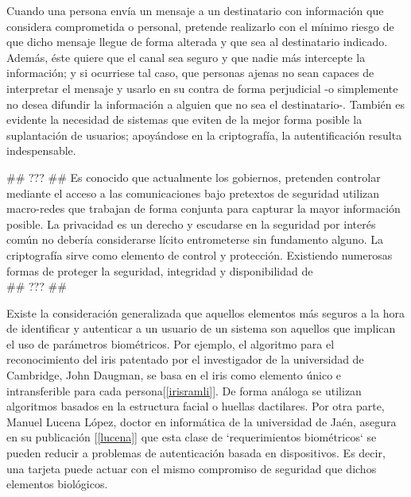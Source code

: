 \documentclass[PFC.tex]{subfiles}
\begin{document}
Cuando una persona envía un mensaje a un destinatario con información que considera comprometida o personal, pretende realizarlo con el mínimo riesgo de que dicho mensaje llegue de forma alterada y que sea al destinatario indicado. Además, éste quiere que el canal sea seguro y que nadie más intercepte la información; y si ocurriese tal caso, que personas ajenas no sean capaces de interpretar el mensaje y usarlo en su contra de forma perjudicial -o simplemente no desea difundir la información a alguien que no sea el destinatario-. También es evidente la necesidad de sistemas que eviten de la mejor forma posible la suplantación de usuarios; apoyándose en la criptografía, la autentificación resulta indespensable.


## ??? ##
Es conocido que actualmente los gobiernos, pretenden controlar mediante el acceso a las comunicaciones bajo pretextos de seguridad utilizan macro-redes que trabajan de forma conjunta para capturar la mayor información posible.  La privacidad es un derecho y escudarse en la seguridad por interés común no debería considerarse lícito entrometerse sin fundamento alguno. La criptografía sirve como elemento de control y protección. Existiendo numerosas formas de proteger la seguridad, integridad y disponibilidad de \\
## ??? ##

Existe la consideración generalizada que aquellos elementos más seguros a la hora de identificar y autenticar a un usuario de un sistema son aquellos que implican el uso de parámetros biométricos. Por ejemplo, el algoritmo para el reconocimiento del iris patentado por el investigador de la universidad de Cambridge, John Daugman, se basa en el iris como elemento único e intransferible para cada persona[\ref{irisramli}]. De forma análoga se utilizan algoritmos basados en la estructura facial o huellas dactilares. Por otra parte, Manuel Lucena López, doctor en informática de la universidad de Jaén, asegura en su publicación [\ref{lucena}] que esta clase de `requerimientos biométricos` se pueden reducir a problemas de autenticación basada en dispositivos. Es decir, una tarjeta puede actuar con el mismo compromiso de seguridad que dichos elementos biológicos.\\
\end{document}
